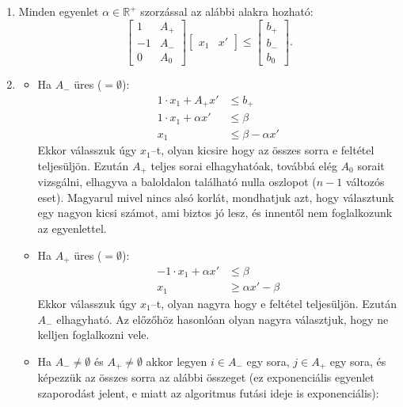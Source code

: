 \begin{enumerate}
  \item Minden egyenlet $\alpha \in \mathbb{R}^+$ szorzással az alábbi alakra
  hozható:
  \begin{displaymath}
  \begin{bmatrix}
  1  & A_+ \\
  -1 & A_- \\
  0  & A_0
  \end{bmatrix}
  \begin{bmatrix}
  x_1 & 
  x'
  \end{bmatrix}
  \leq
  \begin{bmatrix}
  b_+ \\
  b_- \\
  b_0
  \end{bmatrix}.
  \end{displaymath}
  \item 
  \begin{itemize}
  	\item Ha $A_-$ üres ($=\emptyset$): 
  	\begin{align*}
  	1 \cdot x_1 + A_+ x'     &\leq b_+ \\
  	1 \cdot x_1 + \alpha x' &\leq \beta \\
  	x_1 			  &\leq \beta - \alpha x' 
  	\end{align*} 
    Ekkor válasszuk úgy $x_1$--t, olyan kicsire hogy az összes sorra e feltétel
    teljesüljön. Ezután $A_+$ teljes sorai elhagyhatóak, továbbá elég $A_0$
    sorait vizsgálni, elhagyva a baloldalon található nulla oszlopot ($n-1$
    változós eset).
  	Magyarul mivel nincs alsó korlát, mondhatjuk azt, hogy választunk egy nagyon
  	kicsi számot, ami biztos jó lesz, és innentől nem foglalkozunk az
  	egyenlettel.
  	\item Ha $A_+$ üres ($=\emptyset$): 
  	\begin{align*}
  	-1 \cdot x_1 + \alpha x'     &\leq \beta \\
  	x_1 			  &\geq \alpha x' - \beta 
  	\end{align*} 
  	Ekkor válasszuk úgy $x_1$--t, olyan nagyra hogy e feltétel teljesüljön.
  	Ezután $A_-$ elhagyható.
  	Az előzőhöz hasonlóan olyan nagyra választjuk, hogy ne kelljen foglalkozni
  	vele.
  	\item Ha $A_- \neq \emptyset$ és $A_+ \neq \emptyset$ akkor legyen 
  	$i \in A_-$ egy sora, $j \in A_+$ egy sora, és képezzük az összes sorra az
  	alábbi összeget (ez exponenciális egyenlet szaporodást jelent, e miatt az
  	algoritmus futási ideje is exponenciális):

\end{itemize}
\end{enumerate}
